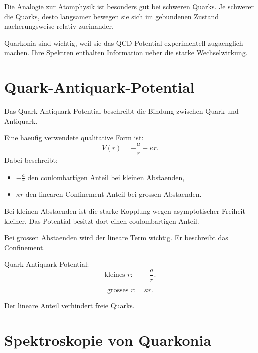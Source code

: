 \begin{notebox}
Die Analogie zur Atomphysik ist besonders gut bei schweren Quarks.
Je schwerer die Quarks, desto langsamer bewegen sie sich im gebundenen Zustand
naeherungsweise relativ zueinander.
\end{notebox}

\begin{examtipbox}
Quarkonia sind wichtig, weil sie das QCD-Potential experimentell zugaenglich machen.
Ihre Spektren enthalten Information ueber die starke Wechselwirkung.
\end{examtipbox}

\section{Quark-Antiquark-Potential}

Das Quark-Antiquark-Potential beschreibt die Bindung zwischen Quark und Antiquark.

\begin{formulabox}
Eine haeufig verwendete qualitative Form ist:
\[
    V(r)
    =
    -\frac{a}{r}
    +
    \kappa r.
\]
Dabei beschreibt:
\begin{itemize}
    \item $-\frac{a}{r}$ den coulombartigen Anteil bei kleinen Abstaenden,
    \item $\kappa r$ den linearen Confinement-Anteil bei grossen Abstaenden.
\end{itemize}
\end{formulabox}

\begin{conceptbox}
Bei kleinen Abstaenden ist die starke Kopplung wegen asymptotischer Freiheit kleiner.
Das Potential besitzt dort einen coulombartigen Anteil.

Bei grossen Abstaenden wird der lineare Term wichtig.
Er beschreibt das Confinement.
\end{conceptbox}

\begin{examtipbox}
Quark-Antiquark-Potential:
\[
    \text{kleines } r:
    \quad
    -\frac{a}{r}.
\]

\[
    \text{grosses } r:
    \quad
    \kappa r.
\]

Der lineare Anteil verhindert freie Quarks.
\end{examtipbox}

\section{Spektroskopie von Quarkonia}

